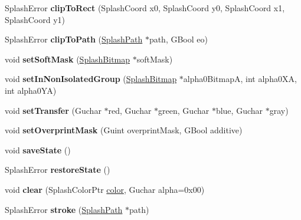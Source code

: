 \begin{DoxyCompactItemize}
Splash\+Error {\bfseries clip\+To\+Rect} (Splash\+Coord x0, Splash\+Coord y0, Splash\+Coord x1, Splash\+Coord y1)
\item 
\mbox{\label{class_splash_aa35122d17c2480b34cd26cd4d3e24a69}} 
Splash\+Error {\bfseries clip\+To\+Path} (\hyperlink{class_splash_path}{Splash\+Path} $\ast$path, G\+Bool eo)
\item 
\mbox{\label{class_splash_a4c6114ec5c97d841b54e113690d3ef61}} 
void {\bfseries set\+Soft\+Mask} (\hyperlink{class_splash_bitmap}{Splash\+Bitmap} $\ast$soft\+Mask)
\item 
\mbox{\label{class_splash_ad2a5f527a8bc7a40d004eb8e42cffc30}} 
void {\bfseries set\+In\+Non\+Isolated\+Group} (\hyperlink{class_splash_bitmap}{Splash\+Bitmap} $\ast$alpha0\+BitmapA, int alpha0\+XA, int alpha0\+YA)
\item 
\mbox{\label{class_splash_af3e0690f908cb75f766dc1be75d99028}} 
void {\bfseries set\+Transfer} (Guchar $\ast$red, Guchar $\ast$green, Guchar $\ast$blue, Guchar $\ast$gray)
\item 
\mbox{\label{class_splash_a3335514dfae78549700357e23e3f7aa7}} 
void {\bfseries set\+Overprint\+Mask} (Guint overprint\+Mask, G\+Bool additive)
\item 
\mbox{\label{class_splash_a4447440ee2e01939927722c75bac1c5f}} 
void {\bfseries save\+State} ()
\item 
\mbox{\label{class_splash_abf142b5c7b365c697e9093d3a8a3a083}} 
Splash\+Error {\bfseries restore\+State} ()
\item 
\mbox{\label{class_splash_a2227ac959c62cf5440fbde97cd1c3afb}} 
void {\bfseries clear} (Splash\+Color\+Ptr \hyperlink{structcolor}{color}, Guchar alpha=0x00)
\item 
\mbox{\label{class_splash_aba090f8f57fd1710e6242fe7899cbbe1}} 
Splash\+Error {\bfseries stroke} (\hyperlink{class_splash_path}{Splash\+Path} $\ast$path)
\item 
\mbox{\label{class_splash_a06d1d5df495306fa8fe93316514bba6d}} 

\end{DoxyCompactItemize}

